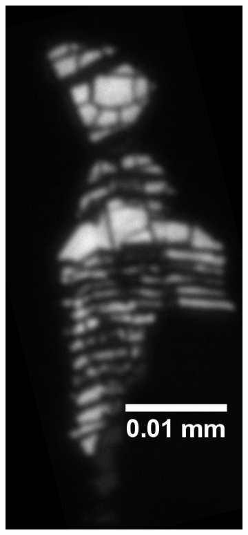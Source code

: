 \begin{figure}[H]
\begin{subfigure}{0.24\textwidth}
        \includegraphics[width=\textwidth]{img/output_t1/M1_3_50_adj_photo}

\end{subfigure}
\end{figure}
